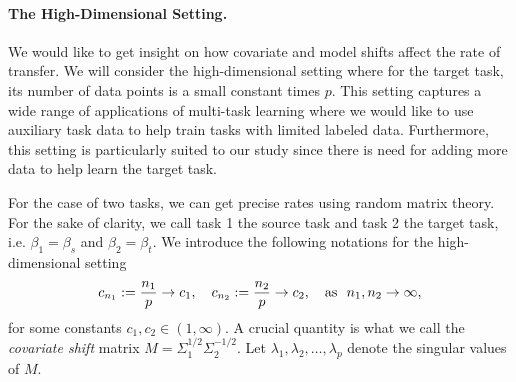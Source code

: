 
\paragraph{The High-Dimensional Setting.}
We would like to get insight on how covariate and model shifts affect the rate of transfer.
We will consider the high-dimensional setting where for the target task, its number of data points is a small constant times $p$.
This setting captures a wide range of applications of multi-task learning where we would like to use auxiliary task data to help train tasks with limited labeled data.
Furthermore, this setting is particularly suited to our study since there is need for adding more data to help learn the target task.

For the case of two tasks, we can get precise rates using random matrix theory.
For the sake of clarity, we call task 1 the source task and task 2 the target task,
i.e. $\beta_1 = \beta_s$ and $\beta_2 = \beta_t$.
We introduce the following notations for the high-dimensional setting
\[ c_{n_1} := \frac{n_1}{p} \to c_1, \quad c_{n_2} := \frac{n_2}p \to c_2, \quad \text{as } \ n_1, n_2\to \infty, \]
for some constants $c_1, c_2 \in (1,\infty)$.
A crucial quantity is what we call the \textit{covariate shift} matrix $M = \Sigma_1^{1/2}\Sigma_2^{-1/2}$.
Let $\lambda_1, \lambda_2, \dots, \lambda_p$ denote the singular values of $M$.


